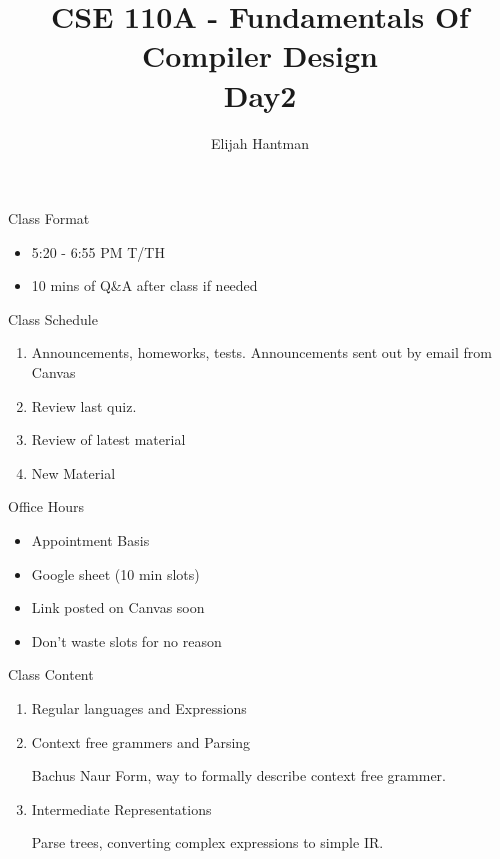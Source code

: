 \documentclass{report}
\title{\Huge{CSE 110A - Fundamentals Of Compiler Design}\\Day2}
\author{\huge{Elijah Hantman}}
\date{}
\begin{document}
\maketitle
\newpage

\begin{description}
    \item Class Format 
        \begin{itemize}
            \item 5:20 - 6:55 PM T/TH
            \item 10 mins of Q\&A after class if needed
        \end{itemize}
    \item Class Schedule
        \begin{enumerate}
            \item Announcements, homeworks, tests. Announcements sent out by email from
                Canvas
            \item Review last quiz.
            \item Review of latest material
            \item New Material
        \end{enumerate}
    \item Office Hours
        \begin{itemize}
            \item Appointment Basis
            \item Google sheet (10 min slots)
            \item Link posted on Canvas soon
            \item Don't waste slots for no reason
        \end{itemize}
    \item Class Content
        \begin{enumerate}
            \item Regular languages and Expressions
            \item Context free grammers and Parsing
                \begin{mdframed}
                    Bachus Naur Form, way to formally
                    describe context free grammer.
                \end{mdframed}
            \item Intermediate Representations
                \begin{mdframed}
                    Parse trees, converting complex expressions to
                    simple IR.
                \end{mdframed}

\end{enumerate}
\end{description}
\end{document}
